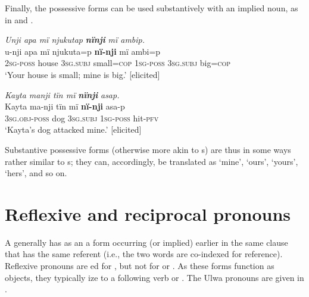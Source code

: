 Finally, the possessive forms can be used substantively with an implied noun, as in  and .

\ea%
    \label{ex:pron:14}
          \textit{Unji apa mï njukutap} \textbf{\textit{nïnji}} \textit{mï ambip.}\\
\gll    u-nji    apa  mï        njukuta=p  \textbf{nï-nji}    mï   ambi=p\\
    2\textsc{sg-poss}  house  3\textsc{sg.subj}  small=\textsc{cop}  1\textsc{sg-poss}  \textsc{3sg.subj}  big=\textsc{cop}\\

\glt   ‘Your house is small; mine is big.’ [elicited]
\z

\ea%
    \label{ex:pron:15}
          \textit{Kayta manji tïn mï} \textbf{\textit{nïnji}} \textit{asap.}\\
\gll    Kayta  ma-nji      tïn    mï      \textbf{nï-nji}    asa-p\\
    [name]  \textsc{3sg.obj-poss}  dog  \textsc{3sg.subj}  \textsc{1sg-poss}  hit-\textsc{pfv}\\
\glt `Kayta’s dog attacked mine.’ [elicited]
\z


Substantive possessive forms (otherwise more akin to s) are thus in some ways rather similar to  s; they can, accordingly, be translated as ‘mine’, ‘ours’, ‘yours’, ‘hers’, and so on.

\section{Reflexive and reciprocal pronouns}\label{sec:6.3}


A   generally has as an  a form occurring (or implied) earlier in the same clause that has the same referent (i.e., the two words are co-indexed for reference). Reflexive pronouns are ed for , but not for  or . As these forms function as objects, they typically ize to a following verb or . The Ulwa  pronouns are given in .


